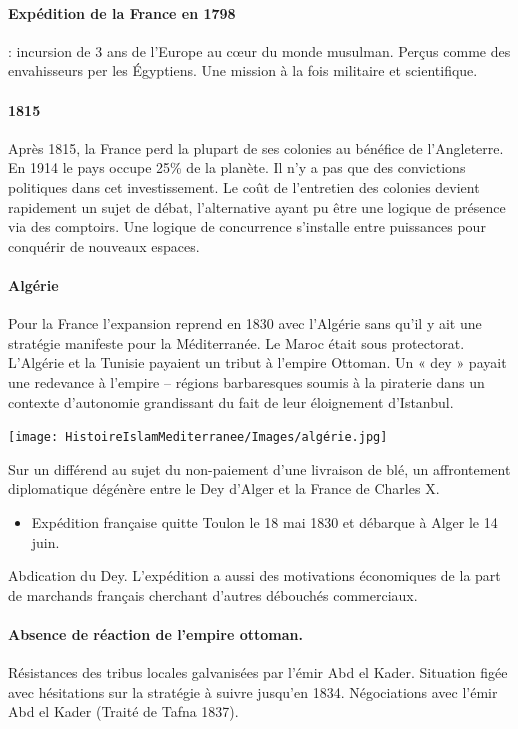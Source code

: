 \paragraph{Expédition de la France en 1798}
 : incursion de 3 ans de l’Europe au cœur du monde musulman. Perçus comme des envahisseurs per les Égyptiens. Une mission à la fois militaire et scientifique.

\paragraph{1815}
Après 1815, la France perd la plupart de ses colonies au bénéfice de l’Angleterre. En 1914 le pays occupe 25\% de la planète.
Il n’y a pas que des convictions politiques dans cet investissement. Le coût de l’entretien des colonies devient rapidement un sujet de débat, l’alternative ayant pu être une logique de présence via des comptoirs.
Une logique de concurrence s’installe entre puissances pour conquérir de nouveaux espaces.
\paragraph{Algérie}
Pour la France l’expansion reprend en 1830 avec l’Algérie sans qu’il y ait une stratégie manifeste pour la Méditerranée.  Le Maroc était sous protectorat. L’Algérie et la Tunisie payaient un tribut à l’empire Ottoman. Un « dey » payait une redevance à l’empire – régions barbaresques soumis à la piraterie dans un contexte d’autonomie grandissant du fait de leur éloignement d’Istanbul.


\texttt{[image: HistoireIslamMediterranee/Images/algérie.jpg]}

Sur un différend au sujet du non-paiement d’une livraison de blé, un affrontement diplomatique dégénère entre le Dey d’Alger et la France de Charles X. 
\begin{itemize}
    \item Expédition française quitte Toulon le 18 mai 1830 et débarque à Alger le 14 juin. 
\end{itemize}
Abdication du Dey. L’expédition a aussi des motivations économiques de la part de marchands français cherchant d’autres débouchés commerciaux.
\paragraph{Absence de réaction de l’empire ottoman. }
Résistances des tribus locales galvanisées par l’émir Abd el Kader.
Situation figée avec hésitations sur la stratégie à suivre jusqu’en 1834. Négociations avec l’émir Abd el Kader (Traité de Tafna 1837).

